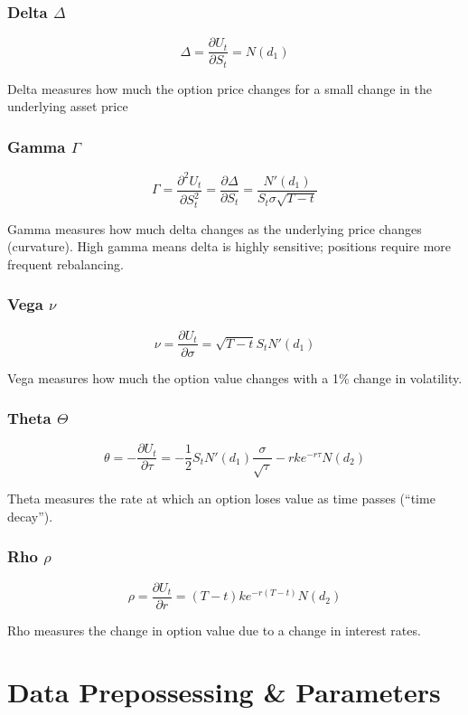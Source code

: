 \documentclass{article}
\begin{document}
\subsubsection{Delta $\Delta$}

$$
\Delta = \frac{\partial U_t}{\partial S_t} = N(d_1)
$$

Delta measures how much the option price changes for a small change in the underlying asset price

\subsubsection{Gamma $\Gamma$}

$$
\Gamma = \frac{\partial^2 U_t}{\partial S_t^2} = \frac{\partial \Delta}{\partial S_t} = \frac{N'(d_1)}{S_t \sigma \sqrt{T-t}}
$$

Gamma measures how much delta changes as the underlying price changes (curvature). High gamma means delta is highly sensitive; positions require more frequent rebalancing.

\subsubsection{Vega $\nu$}

$$
\nu = \frac{\partial U_t}{\partial \sigma} = \sqrt{T-t} S_t N'(d_1)
$$

Vega measures how much the option value changes with a 1\% change in volatility.

\subsubsection{Theta $\Theta$}

$$
\theta = - \frac{\partial U_t}{\partial \tau} = - \frac{1}{2}S_t N'(d_1) \frac{\sigma}{\sqrt{\tau}} - r k e ^{-r\tau} N(d_2)
$$

Theta measures the rate at which an option loses value as time passes (“time decay”).

\subsubsection{Rho $\rho$}

$$
\rho = \frac{\partial U_t}{\partial r} = (T-t) k e^{-r(T-t)} N(d_2)
$$

Rho measures the change in option value due to a change in interest rates.

\newpage

\section{Data Prepossessing \& Parameters}
\end{document}
